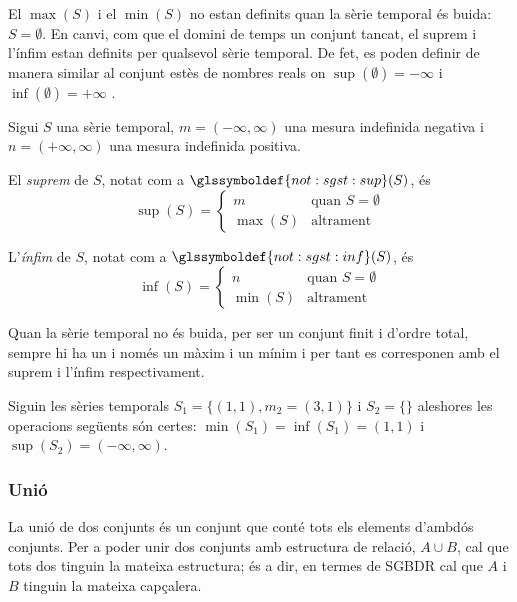 El $\max(S)$ i el $\min(S)$ no estan definits quan la sèrie temporal
és buida: $S= \emptyset$. En canvi, com que el domini de temps un
conjunt tancat, el suprem i l'ínfim estan definits per qualsevol sèrie
temporal. De fet, es poden definir de manera similar al conjunt estès
de nombres reals on $\sup(\emptyset)=-\infty$ i
$\inf(\emptyset)=+\infty$ \parencite{cantrell:extendedreal}.
\begin{definition}\label{def:sgst:sup}\label{def:sgst:inf}
  Sigui $S$ una sèrie temporal, $m=(-\infty,\infty)$ una mesura
  indefinida negativa i $n=(+\infty,\infty)$ una mesura indefinida
  positiva. 

  El \emph{suprem} de $S$, notat com a
  $\glssymboldef{not:sgst:sup}(S)$, és
  \[
  \sup(S) = 
  \begin{cases}
    m & \text{quan } S=\emptyset\\
    \max(S) & \text{altrament}
  \end{cases}
  \]

  L'\emph{ínfim} de $S$, notat com a
  $\glssymboldef{not:sgst:inf}(S)$, és
  \[
  \inf(S) = 
  \begin{cases}
    n & \text{quan } S=\emptyset\\
    \min(S) & \text{altrament}
  \end{cases}
  \]
\end{definition}

Quan la sèrie temporal no és buida, per
ser un conjunt finit i d'ordre total, sempre hi ha un i només un màxim
i un mínim i per tant es corresponen amb el suprem i l'ínfim
respectivament.


\begin{example}
  Siguin les sèries temporals $S_1=\{(1,1),m_2=(3,1)\}$ i $S_2=\{\}$
  aleshores les operacions següents són certes:
  $\min(S_1)=\inf(S_1)=(1,1)$ i $\sup(S_2)=(-\infty,\infty)$.
\end{example}





\subsubsection{Unió}


La unió de dos conjunts és un conjunt que conté tots els elements
d'ambdós conjunts.  Per a poder unir dos conjunts amb estructura de
relació, $A \cup B$, cal que tots dos tinguin la mateixa estructura;
és a dir, en termes de \gls{SGBDR} cal que $A$ i $B$ tinguin la
mateixa capçalera.

